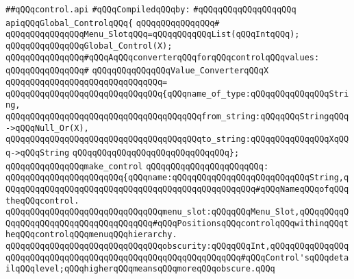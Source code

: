 \label{src/lib/global-controls/global-control.api}
\verb|##qQQqcontrol.api|\newline
\newline
\verb|#qQQqCompiledqQQqby:|\newline
\verb|#qQQqqQQqqQQqqQQqqQQq|\newline
\newline
\verb|apiqQQqGlobal_ControlqQQq{|\newline
\verb|qQQqqQQqqQQqqQQq#|\newline
\verb|qQQqqQQqqQQqqQQqMenu_SlotqQQq=qQQqqQQqqQQqList(qQQqIntqQQq);|\newline
\newline
\verb|qQQqqQQqqQQqqQQqGlobal_Control(X);|\newline
\newline
\verb|qQQqqQQqqQQqqQQq#qQQqAqQQqconverterqQQqforqQQqcontrolqQQqvalues:|\newline
\verb|qQQqqQQqqQQqqQQq#|\newline
\verb|qQQqqQQqqQQqqQQqValue_ConverterqQQqX|\newline
\verb|qQQqqQQqqQQqqQQqqQQqqQQqqQQqqQQq=|\newline
\verb|qQQqqQQqqQQqqQQqqQQqqQQqqQQqqQQq{qQQqname_of_type:qQQqqQQqqQQqqQQqString,|\newline
\verb|qQQqqQQqqQQqqQQqqQQqqQQqqQQqqQQqqQQqqQQqfrom_string:qQQqqQQqStringqQQq->qQQqNull_Or(X),|\newline
\verb|qQQqqQQqqQQqqQQqqQQqqQQqqQQqqQQqqQQqqQQqto_string:qQQqqQQqqQQqqQQqXqQQq->qQQqString|\newline
\verb|qQQqqQQqqQQqqQQqqQQqqQQqqQQqqQQq};|\newline
\newline
\verb|qQQqqQQqqQQqqQQqmake_control|\newline
\verb|qQQqqQQqqQQqqQQqqQQqqQQq:|\newline
\verb|qQQqqQQqqQQqqQQqqQQqqQQq{qQQqname:qQQqqQQqqQQqqQQqqQQqqQQqqQQqString,qQQqqQQqqQQqqQQqqQQqqQQqqQQqqQQqqQQqqQQqqQQqqQQqqQQq#qQQqNameqQQqofqQQqtheqQQqcontrol.|\newline
\verb|qQQqqQQqqQQqqQQqqQQqqQQqqQQqqQQqmenu_slot:qQQqqQQqMenu_Slot,qQQqqQQqqQQqqQQqqQQqqQQqqQQqqQQqqQQqqQQq#qQQqPositionsqQQqcontrolqQQqwithinqQQqtheqQQqcontrolqQQqmenuqQQqhierarchy.|\newline
\verb|qQQqqQQqqQQqqQQqqQQqqQQqqQQqqQQqobscurity:qQQqqQQqInt,qQQqqQQqqQQqqQQqqQQqqQQqqQQqqQQqqQQqqQQqqQQqqQQqqQQqqQQqqQQqqQQq#qQQqControl'sqQQqdetailqQQqlevel;qQQqhigherqQQqmeansqQQqmoreqQQqobscure.qQQq|\newline
